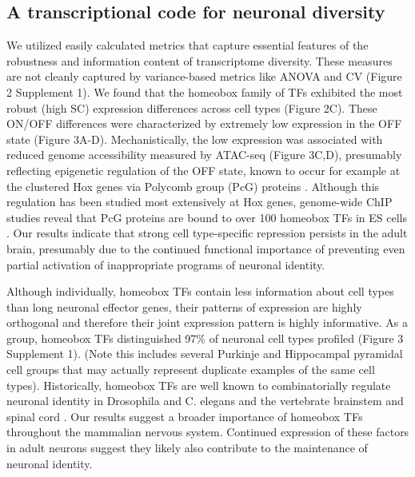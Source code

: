 \subsection{A transcriptional code for neuronal diversity}
We utilized easily calculated metrics that capture essential features of the robustness and information content of transcriptome diversity. These measures are not cleanly captured by variance-based metrics like ANOVA and CV (Figure 2 Supplement 1). We found that the homeobox family of TFs exhibited the most robust (high SC) expression differences across cell types (Figure 2C). These ON/OFF differences were characterized by extremely low expression in the OFF state (Figure 3A-D). Mechanistically, the low expression was associated with reduced genome accessibility measured by ATAC-seq (Figure 3C,D), presumably reflecting epigenetic regulation of the OFF state, known to occur for example at the clustered Hox genes via Polycomb group (PcG) proteins \citep{Montavon_2014}. Although this regulation has been studied most extensively at Hox genes, genome-wide ChIP studies reveal that PcG proteins are bound to over 100 homeobox TFs in ES cells \citep{Boyer_2006}. Our results indicate that strong cell type-specific repression persists in the adult brain, presumably due to the continued functional importance of preventing even partial activation of inappropriate programs of neuronal identity. 

Although individually, homeobox TFs contain less information about cell types than long neuronal effector genes, their patterns of expression are highly orthogonal and therefore their joint expression pattern is highly informative. As a group, homeobox TFs distinguished 97\% of neuronal cell types profiled (Figure 3 Supplement 1). (Note this includes several Purkinje and Hippocampal pyramidal cell groups that may actually represent duplicate examples of the same cell types). Historically, homeobox TFs are well known to combinatorially regulate neuronal identity in Drosophila and C. elegans \citep{Kratsios_2017} and the vertebrate brainstem and spinal cord \citep{Dasen_2009,Philippidou_2013}. Our results suggest a broader importance of homeobox TFs throughout the mammalian nervous system. Continued expression of these factors in adult neurons suggest they likely also contribute to the maintenance of neuronal identity.

